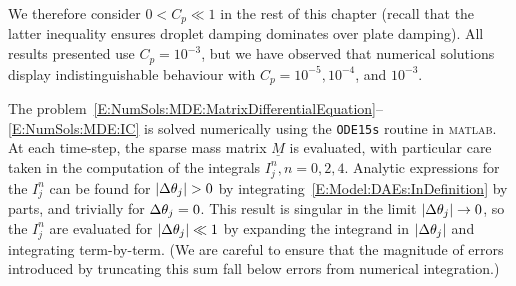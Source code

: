 We therefore consider $0 < C_p \ll 1$  in the rest of this chapter (recall that the latter inequality ensures droplet damping dominates over plate damping). All results presented use $C_p= 10^{-3}$, but we have observed that numerical solutions display indistinguishable behaviour with $C_p = 10^{-5}, 10^{-4}$, and $10^{-3}$.

The problem~\eqref{E:NumSols:MDE:MatrixDifferentialEquation}--\eqref{E:NumSols:MDE:IC} is solved numerically using the \texttt{ODE15s} routine in \textsc{matlab}. At each time-step, the sparse mass matrix $\underline{M}$ is evaluated, with particular care taken in the computation of the integrals $I_j^n, n = 0,2,4$. Analytic expressions for the $I_j^n$ can be found for $|\dthetaj|>0$ by integrating~\eqref{E:Model:DAEs:InDefinition} by parts, and trivially for $\Delta \theta_j=0$. This result is singular in the limit $|\Delta \theta_j| \to 0$, so the $I_j^n$ are evaluated for $|\Delta \theta_j|\ll 1$ by expanding the integrand in $|\Delta \theta_j|$ and integrating term-by-term. (We are careful to ensure that the magnitude of errors introduced by truncating this sum fall below errors from numerical integration.)

